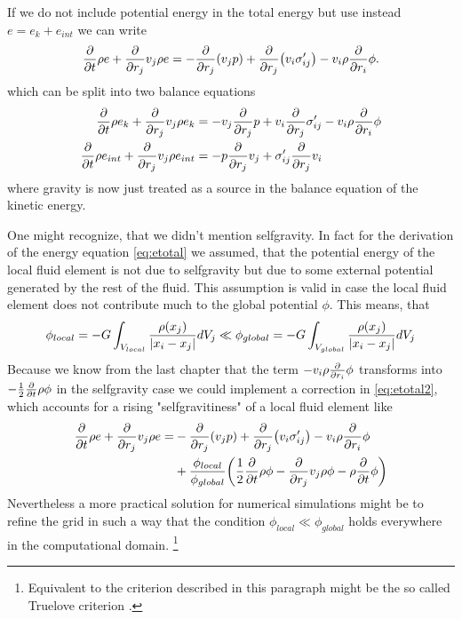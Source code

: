 If we do not include potential energy in the total energy but use instead
$e = e_k+e_{int}$ we can write
\begin{align}
\frac{\partial}{\partial t}\rho e + \frac{\partial}{\partial r_j} v_j \rho e = -\frac{\partial}{\partial r_j}{ \left( v_j p \right) }
+\frac{\partial}{\partial r_j}{ \left( v_i \sigma'_{ij} \right) } - v_i \rho \frac{\partial}{\partial r_i} \phi. \label{eq:etotal2}
\end{align}
which can be split into two balance equations
\begin{align}
\frac{\partial}{\partial t}\rho e_{k} + \frac{\partial}{\partial r_j} v_j \rho e_{k} &= -v_j \frac{\partial}{\partial r_j} p
+ v_i \frac{\partial}{\partial r_j} \sigma'_{ij} - v_i \rho \frac{\partial}{\partial r_i} \phi\\
\frac{\partial}{\partial t}\rho e_{int} + \frac{\partial}{\partial r_j} v_j \rho e_{int} &= -p \frac{\partial}{\partial r_j}v_j
+\sigma'_{ij} \frac{\partial}{\partial r_j}v_i
\end{align}
where gravity is now just treated as a source in the balance equation of the
kinetic energy.

One might recognize, that we didn't mention selfgravity. In fact for the
derivation of the energy equation \eqref{eq:etotal} we assumed, that the
potential energy of the local fluid element is not due to selfgravity but due
to some external potential generated by the rest of the fluid. This assumption
is valid in case the local fluid element does not contribute much to the global
potential $\phi$. This means, that 
\begin{align}
\phi_{local}= -G \int_{V_{local}}\frac{\rho{ \left( x_j \right) }}{\left\lvert x_i-x_j\right\rvert}dV_j \ll
\phi_{global}= -G \int_{V_{global}}\frac{\rho{ \left( x_j \right) }}{\left\lvert x_i-x_j\right\rvert}dV_j
\end{align}
Because we know from the last chapter that the term $- v_i \rho \frac{\partial}{\partial r_i} \phi$
transforms into $-\frac{1}{2}\frac{\partial}{\partial t}\rho\phi$ in the selfgravity case we could
implement a correction in \eqref{eq:etotal2}, which accounts for a rising
"selfgravitiness" of a local fluid element like
\begin{align}
\begin{split}
\frac{\partial}{\partial t}\rho e + \frac{\partial}{\partial r_j} v_j \rho e =& -\frac{\partial}{\partial r_j}{ \left( v_j p \right) }
+\frac{\partial}{\partial r_j}{ \left( v_i \sigma'_{ij} \right) } - v_i \rho \frac{\partial}{\partial r_i} \phi\\
&+\frac{\phi_{local}}{\phi_{global}}
{ \left( \frac{1}{2}\frac{\partial}{\partial t}\rho\phi-\frac{\partial}{\partial r_j}v_j\rho\phi-\rho\frac{\partial}{\partial t}\phi \right) }
\end{split}
\end{align}
Nevertheless a more practical solution for numerical simulations might be to
refine the grid in such a way that the condition $\phi_{local} \ll
\phi_{global}$ holds everywhere in the computational domain.
\footnote{Equivalent to the criterion described in this paragraph might be the
so called Truelove criterion \citep{Truelove1997}.} 

